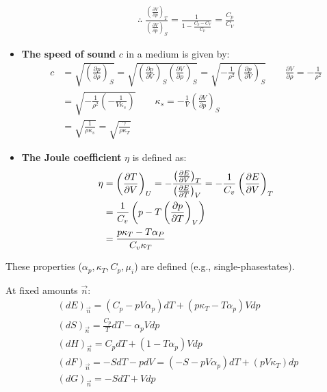 \begin{defn}
\begin{itemize}
\begin{tui}
\begin{gather*}
\therefore \; \frac{\left( \frac{\partial V}{\partial p} \right)_T}
{\left( \frac{\partial V}{\partial p} \right)_S}
=\frac{1}{1-\frac{C_p-C_V}{C_p}}=\frac{C_p}{C_V}
\end{gather*}
\end{tui}
\item 
\textbf{The speed of sound} \(c\) in a medium is given by:
\begin{align*}
    c &= \sqrt{\left( \frac{\partial p}{\partial \rho} \right)_S} 
    = \sqrt{\left( \frac{\partial p}{\partial V} \right)_S \left( \frac{\partial V}{\partial \rho} \right)_S} 
    = \sqrt{-\frac{1}{\rho^2} \left( \frac{\partial p}{\partial V} \right)_S}
    \qquad \frac{\partial V}{\partial \rho} = -\frac{1}{\rho^2} \\
    &= \sqrt{-\frac{1}{\rho^2} \left( -\frac{1}{V \kappa_s} \right)} 
    \qquad \kappa_s = -\frac{1}{V} \left( \frac{\partial V}{\partial p} \right)_S \\
    &= \sqrt{\frac{1}{\rho \kappa_s}} =\sqrt{\frac{\gamma}{\rho \kappa_T}}
\end{align*}
\item
\textbf{The Joule coefficient} \(\eta\) is defined as:
\begin{align*}
\eta &= \left( \frac{\partial T}{\partial V} \right)_U 
=-\frac{\left(\frac{\partial E}{\partial V}\right)_T}{\left(\frac{\partial E}{\partial T}\right)_V}
= -\frac{1}{C_v} \left( \frac{\partial E}{\partial V} \right)_T \\
&= \frac{1}{C_v} \left( p - T \left( \frac{\partial p}{\partial T} \right)_V \right) \\
&= \frac{p\kappa_T - T\alpha_P}{C_v\kappa_T}
\end{align*}
\end{itemize}
\end{defn}
\begin{example}\label{generalrelations}
    \begin{yzh}
        These properties (\(\alpha_p,\kappa_T,C_p,\mu_i\)) are defined
        (e.g., single-phasestates).
    \end{yzh}

    At fixed amounts \(\vec{n}\):
    \begin{gather*}
        (dE)_{\vec{n}}= (C_p -pV\alpha_p) dT + (p\kappa_T -T \alpha_p)V  dp
        \\(dS)_{\vec{n}}= \frac{C_p}{T} dT -\alpha_p V dp
        \\(dH)_{\vec{n}}= C_p  dT+(1-T \alpha_p)V dp\\
        (dF)_{\vec{n}} = -S dT - p dV 
        =( -S - p V \alpha_p ) dT + ( p V \kappa_T ) dp\\
        (dG)_{\vec{n}} = -S dT + V dp
    \end{gather*}
\end{example}
